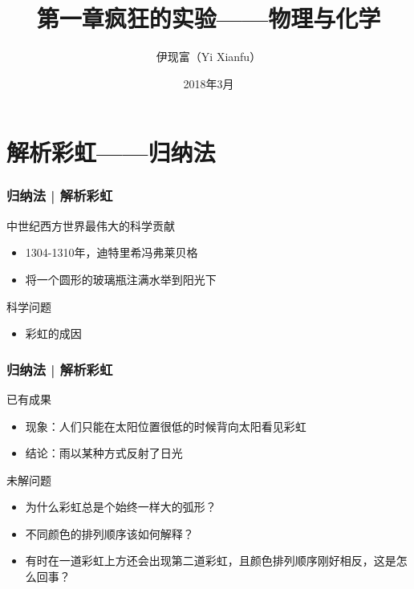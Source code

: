 



\title[物理与化学]{第一章\quad 疯狂的实验——物理与化学}
\author[Yixf]{伊现富（Yi Xianfu）}
\date{2018年3月}



\section{解析彩虹——归纳法}
\begin{frame}
  \frametitle{归纳法 | 解析彩虹}
  \begin{block}{中世纪西方世界最伟大的科学贡献}
    \begin{itemize}
      \item 1304-1310年，迪特里希\textbullet 冯\textbullet 弗莱贝格
      \item 将一个圆形的玻璃瓶注满水举到阳光下
    \end{itemize}
  \end{block}
  \pause
  \begin{block}{科学问题}
    \begin{itemize}
      \item 彩虹的成因
    \end{itemize}
    \vspace{-1.5em}
    \begin{figure}
      \centering
    \end{figure}
  \end{block}
\end{frame}

\begin{frame}
  \frametitle{归纳法 | 解析彩虹}
  \begin{block}{已有成果}
    \begin{itemize}
      \item 现象：人们只能在太阳位置很低的时候背向太阳看见彩虹
      \item 结论：雨以某种方式反射了日光
    \end{itemize}
  \end{block}
  \pause
  \begin{block}{未解问题}
    \begin{itemize}
      \item 为什么彩虹总是个始终一样大的弧形？
      \item 不同颜色的排列顺序该如何解释？
      \item 有时在一道彩虹上方还会出现第二道彩虹，且颜色排列顺序刚好相反，这是怎么回事？
    \end{itemize}
  \end{block}
\end{frame}

